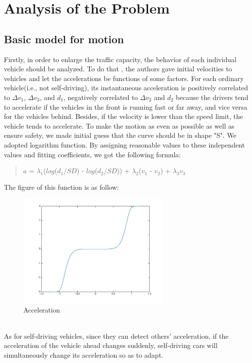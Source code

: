 \documentclass{icmmcm}
\begin{document}
\section{Analysis of the Problem}
\subsection{Basic model for motion}
Firstly, in order to enlarge the traffic capacity, the behavior of each individual vehicle should be analyzed. To do that , the authors gave  initial velocities to vehicles and let the accelerations be  functions of some factors. For each ordinary vehicle(i.e., not self-driving), its instantaneous acceleration is positively correlated to $\Delta$$v_{1}$, $\Delta$$v_{3}$, and $d_{1}$, negatively correlated to $\Delta$$v_{2}$ and $d_{2}$ because the drivers tend to accelerate if the vehicles in the front is running fast or far away, and vice versa for the vehicles behind. Besides, if the velocity is lower than the speed limit, the vehicle tends to accelerate. To make the motion as even as possible as well as ensure safety, we made initial guess that the curve should be in shape "S". We adopted logarithm function. By assigning reasonable values to these independent values and fitting coefficients, we got the following formula:
\begin{quotation}
$a$ = $\lambda_{1}$($log$($d_{1}$/$SD$) - $log$($d_{2}$/$SD$)) + $\lambda_{2}$($v_{1}$ - $v_{2}$) + $\lambda_{3}$$v_{3}$ %
\end{quotation}
The figure of this function is as follow:\\
\begin{figure}[!htp]
\centering
\includegraphics[height=5.7cm]{Acceleration.jpg}
\caption{Acceleration}
\end{figure}
\\
As for self-driving vehicles, since they can detect others' acceleration, if the acceleration of the vehicle ahead changes suddenly, self-driving cars will simultaneously change its acceleration so as to adapt.\\
\end{document}
